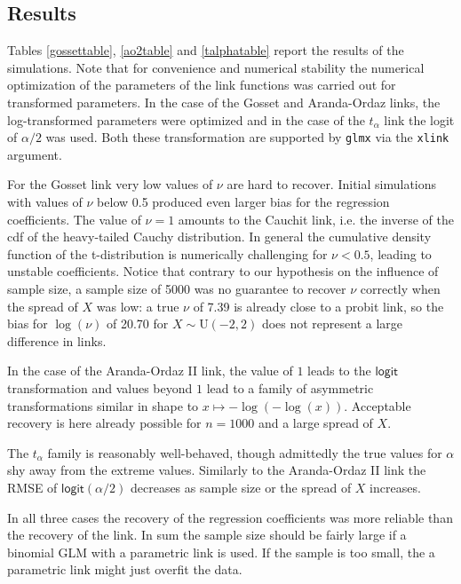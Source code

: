 \documentclass[a4paper,10 pt]{article}
\begin{document}
\subsection{Results}
Tables \ref{gossettable}, \ref{ao2table} and \ref{talphatable} report the results of the simulations. Note that for convenience and numerical stability the numerical optimization of the parameters of the link functions was carried out for transformed parameters. In the case of the Gosset and Aranda-Ordaz links, the log-transformed parameters were optimized and in the case of the $t_\alpha$ link the logit of $\alpha/2$ was used. Both these transformation are supported by \texttt{glmx} via the \texttt{xlink} argument.

For the Gosset link very low values of $\nu$ are hard to recover. Initial simulations with values of $\nu$ below 0.5 produced even larger bias for the regression coefficients. The value of $\nu = 1$ amounts to the Cauchit link, i.e. the inverse of the cdf of the heavy-tailed Cauchy distribution. In general the cumulative density function of the t-distribution is numerically challenging for $\nu < 0.5$, leading to unstable coefficients.  Notice that contrary to our hypothesis on the influence of sample size,  a sample size of 5000 was no guarantee to recover $\nu$ correctly when the spread of $X$ was low: a true $\nu$ of 7.39 is already close to a probit link, so the bias for $\log(\nu)$ of 20.70 for $X\sim \text{U}(-2,2)$  does not represent a large difference in links.

In the case of the Aranda-Ordaz II link, the value of $1$ leads to the $\mathsf{logit}$ transformation and values beyond $1$ lead to a family of asymmetric transformations similar in shape to $x\mapsto -\log(-\log(x))$. Acceptable recovery is here already possible for $n = 1000$ and a large spread of $X$.

The $t_\alpha$ family is reasonably well-behaved, though admittedly the true values for $\alpha$ shy away from the extreme values. Similarly to the Aranda-Ordaz II link the RMSE of $\mathsf{logit}(\alpha/2)$ decreases as sample size or the spread of $X$ increases.

In all three cases the recovery of the regression coefficients was more reliable than the recovery of the link. In sum the sample size should be fairly large if a binomial GLM with a parametric link is used. If the sample is too small, the a parametric link might just overfit the data.

%
%
%
\end{document}
